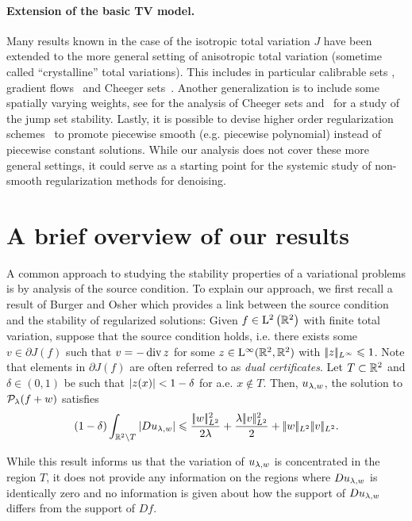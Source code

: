 \paragraph{Extension of the basic TV model.}

Many results known in the case of the isotropic total variation $J$ have been extended to the more general setting of anisotropic total variation (sometime called ``crystalline'' total variations). This includes in particular calibrable sets \cite{casanisotrop08}, gradient flows~\cite{belfacetbreak01,belcrystmcm07} and Cheeger sets~\cite{anisocheeg2009}.
%
Another generalization is to include some spatially varying weights, see \cite{carlier07} for the analysis of Cheeger sets and~\cite{CasellesJumpFlow} for a study of the jump set stability.  
%
Lastly, it is possible to devise higher order regularization schemes~\cite{ChanMarquina00,BrediesTGV} to promote piecewise smooth (e.g. piecewise polynomial) instead of piecewise constant solutions.
%
While our analysis does not cover these more general settings, it could serve as a starting point for the systemic study of non-smooth regularization methods for denoising. 
\fi

\section{A brief overview of our results}
\label{sec:ourapproach}

A common approach to studying the stability properties of a variational problems is  by analysis of the source condition. To explain our approach, we  first recall a result of Burger and Osher \cite{burger2004convergence} which provides a link between the source condition and the stability of regularized solutions:  Given  $f\in \mathrm{L}^2\left(\mathbb{R}^2\right)$ with finite total variation, suppose that the source condition holds, i.e.  there exists some $v\in \partial J(f)$ such that $v = -\operatorname{div} z$ for some $z\in \mathrm{L}^\infty(\mathbb{R}^2, \mathbb{R}^2)$ with $|\!| z |\!|_{L^\infty}\leqslant 1$. Note that elements in $\partial J(f)$ are often referred to as \emph{dual certificates}. Let $T\subset \mathbb{R}^2$ and $\delta \in (0,1)$ be such that $\left| z(x) \right|<1- \delta$  for a.e. $x\not\in T$. Then,
 $u_{\lambda,w}$, the solution to $\mathcal{P}_\lambda(f+w)$ satisfies
$$
(1-\delta)\int_{\RR^2\setminus T} \abs{D \ulaw}\leq  \frac{\normLdeux{w}^2}{2\lambda} +\frac{\lambda  \norm{v}_{L^2}^2}{2} + \normLdeux{w} \norm{v}_{L^2}.
$$

While this result informs us that the variation of $u_{\lambda,w}$ is concentrated in the region $T$, it does not provide any information on the regions where $D u_{\lambda,w}$ is identically zero and no information is given about how the support of $D u_{\lambda,w}$ differs from the support of $D f$. 

